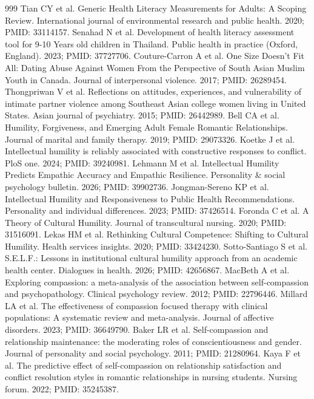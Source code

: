 \documentclass[11pt]{article}
\begin{document}
\begin{thebibliography}{999}
 Tian CY et al. Generic Health Literacy Measurements for Adults: A Scoping Review. International journal of environmental research and public health. 2020; PMID: 33114157.
 Senahad N et al. Development of health literacy assessment tool for 9-10 Years old children in Thailand. Public health in practice (Oxford, England). 2023; PMID: 37727706.
 Couture-Carron A et al. One Size Doesn't Fit All: Dating Abuse Against Women From the Perspective of South Asian Muslim Youth in Canada. Journal of interpersonal violence. 2017; PMID: 26289454.
 Thongpriwan V et al. Reflections on attitudes, experiences, and vulnerability of intimate partner violence among Southeast Asian college women living in United States. Asian journal of psychiatry. 2015; PMID: 26442989.
 Bell CA et al. Humility, Forgiveness, and Emerging Adult Female Romantic Relationships. Journal of marital and family therapy. 2019; PMID: 29073326.
 Koetke J et al. Intellectual humility is reliably associated with constructive responses to conflict. PloS one. 2024; PMID: 39240981.
 Lehmann M et al. Intellectual Humility Predicts Empathic Accuracy and Empathic Resilience. Personality \& social psychology bulletin. 2026; PMID: 39902736.
 Jongman-Sereno KP et al. Intellectual Humility and Responsiveness to Public Health Recommendations. Personality and individual differences. 2023; PMID: 37426514.
 Foronda C et al. A Theory of Cultural Humility. Journal of transcultural nursing. 2020; PMID: 31516091.
 Lekas HM et al. Rethinking Cultural Competence: Shifting to Cultural Humility. Health services insights. 2020; PMID: 33424230.
 Sotto-Santiago S et al. S.E.L.F.: Lessons in institutional cultural humility approach from an academic health center. Dialogues in health. 2026; PMID: 42656867.
 MacBeth A et al. Exploring compassion: a meta-analysis of the association between self-compassion and psychopathology. Clinical psychology review. 2012; PMID: 22796446.
 Millard LA et al. The effectiveness of compassion focused therapy with clinical populations: A systematic review and meta-analysis. Journal of affective disorders. 2023; PMID: 36649790.
 Baker LR et al. Self-compassion and relationship maintenance: the moderating roles of conscientiousness and gender. Journal of personality and social psychology. 2011; PMID: 21280964.
 Kaya F et al. The predictive effect of self-compassion on relationship satisfaction and conflict resolution styles in romantic relationships in nursing students. Nursing forum. 2022; PMID: 35245387.

\end{thebibliography}
\end{document}
